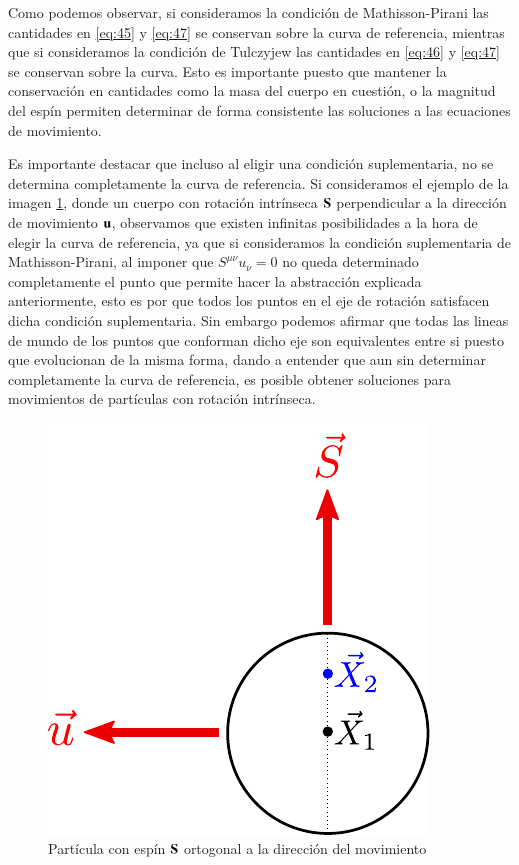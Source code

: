 Como podemos observar, si consideramos la condición de Mathisson-Pirani las cantidades en \eqref{eq:45} y \eqref{eq:47} se conservan sobre la curva de referencia, mientras que si consideramos la condición de Tulczyjew las cantidades en \eqref{eq:46} y \eqref{eq:47} se conservan sobre la curva. Esto es importante puesto que mantener la conservación en cantidades como la masa del cuerpo en cuestión, o la magnitud del espín permiten determinar de forma consistente las soluciones a las ecuaciones de movimiento.

Es importante destacar que incluso al eligir una condición suplementaria, no se determina completamente la curva de referencia. Si consideramos el ejemplo de la imagen \ref{fig:pirani}, donde un cuerpo con rotación intrínseca $\vb{S}$ perpendicular a la dirección de movimiento $\vb{u}$, observamos que existen infinitas posibilidades a la hora de elegir la curva de referencia, ya que si consideramos la condición suplementaria de Mathisson-Pirani, al imponer que $S^{\mu \nu} u_{\nu} = 0$ no queda determinado completamente el punto que permite hacer la abstracción explicada anteriormente, esto es por que todos los puntos en el eje de rotación satisfacen dicha condición suplementaria. Sin embargo podemos afirmar que todas las lineas de mundo de los puntos que conforman dicho eje son equivalentes entre si puesto que evolucionan de la misma forma, dando a entender que aun sin determinar completamente la curva de referencia, es posible obtener soluciones para movimientos de partículas con rotación intrínseca.

\begin{figure}[!h]
\centering
\includegraphics[scale=1]{images/cond-suplementaria.pdf}
\caption[Condición suplementaria de Pirani]{Partícula con espín $\vb{S}$ ortogonal a la dirección del movimiento}
\label{fig:pirani}
\end{figure}

